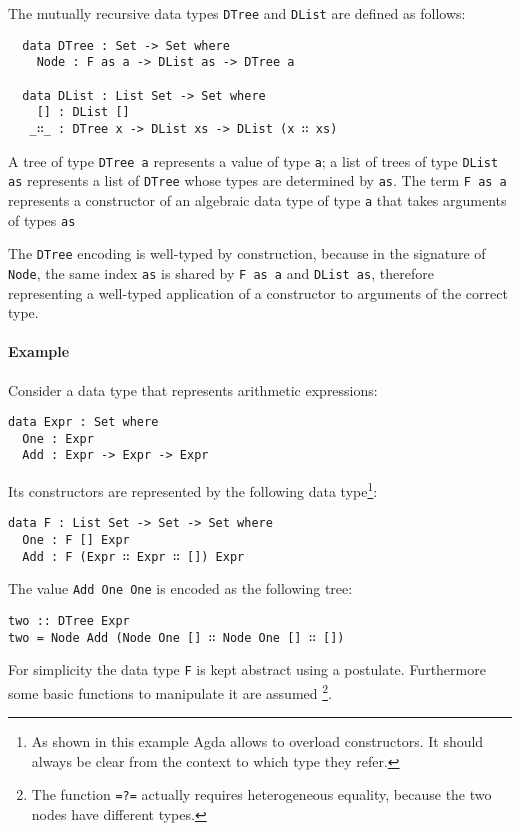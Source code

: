 \documentclass[../Thesis.tex]{subfiles}
\begin{document}
		The mutually recursive data types \texttt{DTree} and \texttt{DList} are
		defined as follows: 
					
\begin{verbatim}
  data DTree : Set -> Set where
    Node : F as a -> DList as -> DTree a

  data DList : List Set -> Set where
    [] : DList []
   _∷_ : DTree x -> DList xs -> DList (x ∷ xs)
\end{verbatim}
	
		A tree of type \texttt{DTree a} represents a value of type \texttt{a}; 
		a list of trees of type \texttt{DList as} represents a list of 
		\texttt{DTree} whose types are determined by \texttt{as}.
		The term \texttt{F as a} represents a constructor of an algebraic data
		type of type \texttt{a} that takes arguments of types \texttt{as} 

		The \texttt{DTree} encoding is well-typed by construction, because 
		in the signature of \texttt{Node}, the same index \texttt{as}
		is shared by \texttt{F as a} and \texttt{DList as}, therefore  
		representing a well-typed application of a constructor to arguments of 
		the correct type.

	\paragraph{Example}
	Consider a data type that represents arithmetic expressions:
\begin{verbatim}
data Expr : Set where
  One : Expr
  Add : Expr -> Expr -> Expr
\end{verbatim}

	Its constructors are represented by the following data type\footnote{As shown in this example Agda allows to overload constructors. It should
	always be clear from the context to which type they refer.}:
\begin{verbatim}
data F : List Set -> Set -> Set where
  One : F [] Expr
  Add : F (Expr ∷ Expr ∷ []) Expr
\end{verbatim}

	The value \texttt{Add One One} is encoded as
	the following tree:
\begin{verbatim}
two :: DTree Expr
two = Node Add (Node One [] ∷ Node One [] ∷ [])
\end{verbatim}

		For simplicity the data type \texttt{F} is kept abstract using a postulate. 
		Furthermore some basic functions to manipulate it are assumed
		\footnote{The function \texttt{=?=} actually requires heterogeneous
		equality, because the two nodes have different types.}.
				
\end{document}

